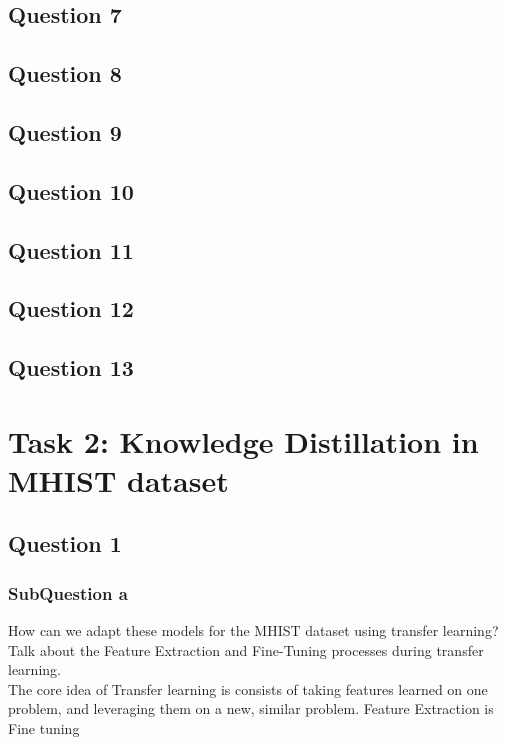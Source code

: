 \documentclass[conference]{IEEEtran}
\begin{document}
\subsection{Question 7}

\subsection{Question 8}

\subsection{Question 9}

\subsection{Question 10}

\subsection{Question 11}

\subsection{Question 12}

\subsection{Question 13}

\section{Task 2: Knowledge Distillation in MHIST dataset}

\subsection{Question 1}
\subsubsection{SubQuestion a} How can we adapt these models for the MHIST dataset using transfer learning? Talk about the Feature Extraction and Fine-Tuning processes during transfer learning.\\

The core idea of Transfer learning is consists of taking features learned on one problem, and leveraging them on a new, similar problem.\cite{keras}
Feature Extraction is 
\\
Fine tuning
\cite{blog}
\end{document}
